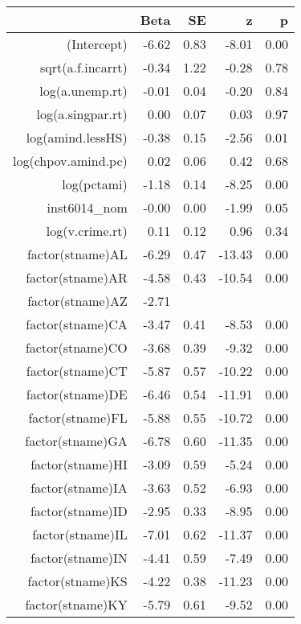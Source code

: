\begin{table}[ht]
\centering
\begin{tabular}{rrrrr}
  \hline
 & Beta & SE & z & p \\ 
  \hline
(Intercept) & -6.62 & 0.83 & -8.01 & 0.00 \\ 
  sqrt(a.f.incarrt) & -0.34 & 1.22 & -0.28 & 0.78 \\ 
  log(a.unemp.rt) & -0.01 & 0.04 & -0.20 & 0.84 \\ 
  log(a.singpar.rt) & 0.00 & 0.07 & 0.03 & 0.97 \\ 
  log(amind.lessHS) & -0.38 & 0.15 & -2.56 & 0.01 \\ 
  log(chpov.amind.pc) & 0.02 & 0.06 & 0.42 & 0.68 \\ 
  log(pctami) & -1.18 & 0.14 & -8.25 & 0.00 \\ 
  inst6014\_nom & -0.00 & 0.00 & -1.99 & 0.05 \\ 
  log(v.crime.rt) & 0.11 & 0.12 & 0.96 & 0.34 \\ 
  factor(stname)AL & -6.29 & 0.47 & -13.43 & 0.00 \\ 
  factor(stname)AR & -4.58 & 0.43 & -10.54 & 0.00 \\ 
  factor(stname)AZ & -2.71 &  &  &  \\ 
  factor(stname)CA & -3.47 & 0.41 & -8.53 & 0.00 \\ 
  factor(stname)CO & -3.68 & 0.39 & -9.32 & 0.00 \\ 
  factor(stname)CT & -5.87 & 0.57 & -10.22 & 0.00 \\ 
  factor(stname)DE & -6.46 & 0.54 & -11.91 & 0.00 \\ 
  factor(stname)FL & -5.88 & 0.55 & -10.72 & 0.00 \\ 
  factor(stname)GA & -6.78 & 0.60 & -11.35 & 0.00 \\ 
  factor(stname)HI & -3.09 & 0.59 & -5.24 & 0.00 \\ 
  factor(stname)IA & -3.63 & 0.52 & -6.93 & 0.00 \\ 
  factor(stname)ID & -2.95 & 0.33 & -8.95 & 0.00 \\ 
  factor(stname)IL & -7.01 & 0.62 & -11.37 & 0.00 \\ 
  factor(stname)IN & -4.41 & 0.59 & -7.49 & 0.00 \\ 
  factor(stname)KS & -4.22 & 0.38 & -11.23 & 0.00 \\ 
  factor(stname)KY & -5.79 & 0.61 & -9.52 & 0.00 \\ 

\end{tabular}
\end{table}

